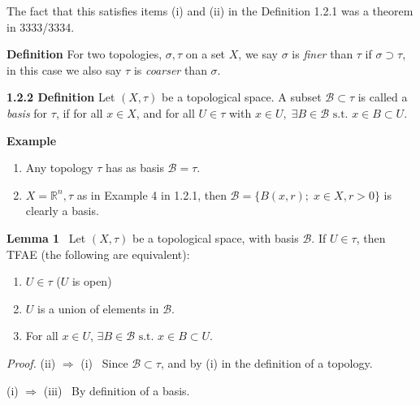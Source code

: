 \documentclass[12pt]{article}
\newcommand{\st}[0]{ \textrm{ s.t. } }
\newcommand{\rimply}[0] { \Rightarrow }
\newcommand{\reals}[0] { \mathbb{R}}
\newcommand{\B}[0] { \mathcal{B} }
\begin{document}
\begin{flushleft}
\begin{enumerate}[i]
         The fact that this satisfies items (i) and (ii) in the Definition
1.2.1 was a theorem in 3333/3334.
    \end{enumerate}\end{flushleft}\begin{flushleft}
 { \bf Definition }For two topologies, $\sigma, \tau$ on a set $X$, we say $\sigma$ is {\em finer}
than $\tau$ if $\sigma \supset \tau$, in this case we also say $\tau$ is {\em
 coarser} than $\sigma$.\end{flushleft}\begin{flushleft}
 { \bf 1.2.2 Definition }Let $(X, \tau)$ be a topological space. A subset $\B \subset \tau$ is called a {\em basis} for $\tau$, if for all $x \in X$,
and for all $U \in \tau$ with $x \in  U, \; \exists B \in \B \st x \in B \subset U$.\end{flushleft}\begin{flushleft}
 { \bf Example }\begin{enumerate}[i]
\item
              Any topology $\tau$ has as basis    $\B = \tau$.
            \item
                $X = \reals^n, \tau$ as in Example 4 in 1.2.1, then
$\B = \{ B(x, r); \; x \in X, r>0 \}$ is clearly a basis.
            \end{enumerate}\end{flushleft}\begin{flushleft}
 { \bf Lemma 1 } \  Let $(X, \tau)$ be a topological space, with basis $\B$. If $U \in \tau$, then TFAE (the following are equivalent):
\begin{enumerate}[i]
\item
                $U \in \tau$ ($U$ is open)
            \item
                $U$ is a union of elements in $\B$.
            \item
                For all $x \in U$, $\exists B \in \B \st x \in B \subset U$.
            \end{enumerate}\begin{flushleft}
 \emph{Proof.  } (ii) $\rimply$ (i) \ Since $\B \subset \tau$, and by (i)
 in the definition of a topology.

  (i)  $\rimply$ (iii) \ By definition of a basis.


\end{flushleft}
\end{flushleft}
\end{document}

